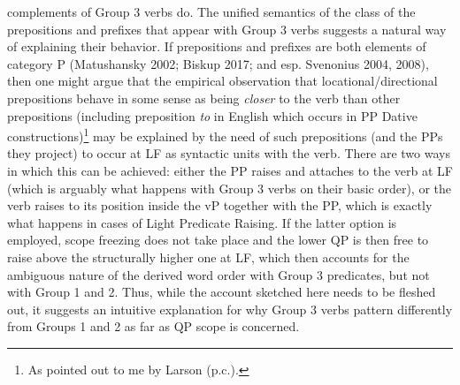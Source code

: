 \documentclass[12pt]{article}
\newenvironment{styleStandard}{\renewcommand\baselinestretch{1.0}\setlength\leftskip{0cm}\setlength\rightskip{0cm plus 1fil}\setlength\parindent{0cm}\setlength\parfillskip{0pt plus 1fil}\setlength\parskip{0in plus 1pt}\writerlistparindent\writerlistleftskip\leavevmode\normalfont\normalsize\writerlistlabel\ignorespaces}{\unskip\vspace{0.111in plus 0.0111in}\par}
\newcommand\writerlistleftskip{}
\newcommand\writerlistparindent{}
\newcommand\writerlistlabel{}
\begin{document}
\begin{styleStandard}
complements of Group 3 verbs do. The unified semantics of the class of the prepositions and prefixes that appear with Group 3 verbs suggests a natural way of explaining their behavior. If prepositions and prefixes are both elements of category P (Matushansky 2002; Biskup 2017; and esp. Svenonius 2004, 2008), then one might argue that the empirical observation that locational/directional prepositions behave in some sense as being \textit{closer} to the verb than other prepositions (including preposition \textit{to} in English which occurs in PP Dative constructions)\footnote{ As pointed out to me by Larson (p.c.).} may be explained by the need of such prepositions (and the PPs they project) to occur at LF as syntactic units with the verb. There are two ways in which this can be achieved: either the PP raises and attaches to the verb at LF (which is arguably what happens with Group 3 verbs on their basic order), or the verb raises to its position inside the vP together with the PP, which is exactly what happens in cases of Light Predicate Raising. If the latter option is employed, scope freezing does not take place and the lower QP is then free to raise above the structurally higher one at LF, which then accounts for the ambiguous nature of the derived word order with Group 3 predicates, but not with Group 1 and 2. Thus, while the account sketched here needs to be fleshed out, it suggests an intuitive explanation for why Group 3 verbs pattern differently from Groups 1 and 2 as far as QP scope is concerned.
\end{styleStandard}
\end{document}

